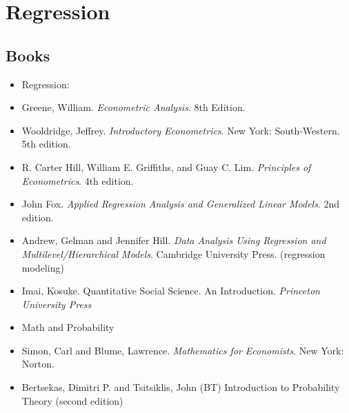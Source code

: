 \documentclass{article}
\begin{document}
\clearpage

\setcounter{section}{0}
\section*{Regression}
\subsection*{Books}

\begin{itemize}	
\item[] Regression:
\item Greene, William. \emph{Econometric Analysis}. 8th Edition.  
\item  Wooldridge, Jeffrey. \emph{Introductory Econometrics}. New York: South-Western. 5th edition.
\item R. Carter Hill, William E. Griffiths, and Guay C. Lim. \emph{Principles of Econometrics}. 4th edition.
\item John Fox. \emph{Applied Regression Analysis and Generalized Linear Models}. 2nd edition.
\item Andrew, Gelman and Jennifer Hill. \emph{Data Analysis Using Regression and Multilevel/Hierarchical Models}. Cambridge University Press. (regression modeling)
\item Imai, Kosuke. Quantitative Social Science. An Introduction.  \emph{Princeton University Press}
\item[] Math and Probability
\item Simon, Carl and Blume, Lawrence. \emph{Mathematics for Economists}. New York: Norton.
\item  Bertsekas, Dimitri P. and Tsitsiklis, John (BT) Introduction to Probability Theory (second edition)


\end{itemize}
\end{document}
